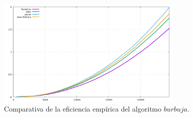 \documentclass[11pt,a4paper]{article}
\begin{document}
\begin{figure}[H]
	\centering
	\includegraphics[width=0.8\textwidth]{../plots/burbuja}
	\caption{Comparativa de la eficiencia empírica del algoritmo $burbuja$.}
\end{figure}
\end{document}
